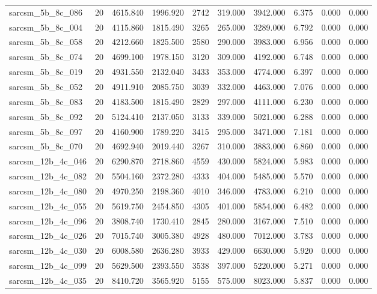 \begin{tabular}{lrrrrrrrrr}
sarcsm\_5b\_8c\_086 & 20 & 4615.840 & 1996.920 & 2742 & 319.000 & 3942.000 & 6.375 & 0.000 & 0.000 \\
sarcsm\_5b\_8c\_004 & 20 & 4115.860 & 1815.490 & 3265 & 265.000 & 3289.000 & 6.792 & 0.000 & 0.000 \\
sarcsm\_5b\_8c\_058 & 20 & 4212.660 & 1825.500 & 2580 & 290.000 & 3983.000 & 6.956 & 0.000 & 0.000 \\
sarcsm\_5b\_8c\_074 & 20 & 4699.100 & 1978.150 & 3120 & 309.000 & 4192.000 & 6.748 & 0.000 & 0.000 \\
sarcsm\_5b\_8c\_019 & 20 & 4931.550 & 2132.040 & 3433 & 353.000 & 4774.000 & 6.397 & 0.000 & 0.000 \\
sarcsm\_5b\_8c\_052 & 20 & 4911.910 & 2085.750 & 3039 & 332.000 & 4463.000 & 7.076 & 0.000 & 0.000 \\
sarcsm\_5b\_8c\_083 & 20 & 4183.500 & 1815.490 & 2829 & 297.000 & 4111.000 & 6.230 & 0.000 & 0.000 \\
sarcsm\_5b\_8c\_092 & 20 & 5124.410 & 2137.050 & 3133 & 339.000 & 5021.000 & 6.288 & 0.000 & 0.000 \\
sarcsm\_5b\_8c\_097 & 20 & 4160.900 & 1789.220 & 3415 & 295.000 & 3471.000 & 7.181 & 0.000 & 0.000 \\
sarcsm\_5b\_8c\_070 & 20 & 4692.940 & 2019.440 & 3267 & 310.000 & 3883.000 & 6.860 & 0.000 & 0.000 \\
sarcsm\_12b\_4c\_046 & 20 & 6290.870 & 2718.860 & 4559 & 430.000 & 5824.000 & 5.983 & 0.000 & 0.000 \\
sarcsm\_12b\_4c\_082 & 20 & 5504.160 & 2372.280 & 4333 & 404.000 & 5485.000 & 5.570 & 0.000 & 0.000 \\
sarcsm\_12b\_4c\_080 & 20 & 4970.250 & 2198.360 & 4010 & 346.000 & 4783.000 & 6.210 & 0.000 & 0.000 \\
sarcsm\_12b\_4c\_055 & 20 & 5619.750 & 2454.850 & 4305 & 401.000 & 5854.000 & 6.482 & 0.000 & 0.000 \\
sarcsm\_12b\_4c\_096 & 20 & 3808.740 & 1730.410 & 2845 & 280.000 & 3167.000 & 7.510 & 0.000 & 0.000 \\
sarcsm\_12b\_4c\_026 & 20 & 7015.740 & 3005.380 & 4928 & 480.000 & 7012.000 & 3.783 & 0.000 & 0.000 \\
sarcsm\_12b\_4c\_030 & 20 & 6008.580 & 2636.280 & 3933 & 429.000 & 6630.000 & 5.920 & 0.000 & 0.000 \\
sarcsm\_12b\_4c\_099 & 20 & 5629.500 & 2393.550 & 3538 & 397.000 & 5220.000 & 5.271 & 0.000 & 0.000 \\
sarcsm\_12b\_4c\_035 & 20 & 8410.720 & 3565.920 & 5155 & 575.000 & 8023.000 & 5.837 & 0.000 & 0.000 \\

\end{tabular}
